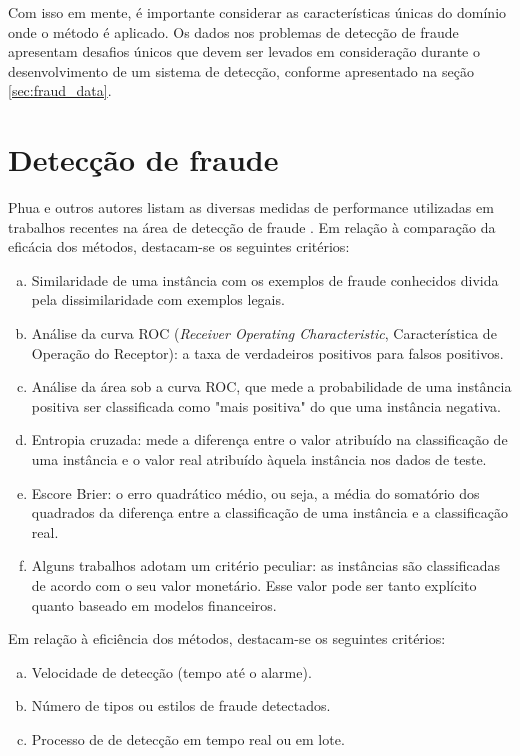 Com isso em mente, é importante considerar as características únicas do domínio onde o método é aplicado. Os dados nos problemas de detecção de fraude apresentam desafios únicos que devem ser levados em consideração durante o desenvolvimento de um sistema de detecção, conforme apresentado na seção \ref{sec:fraud_data}.

\section{Detecção de fraude}
\label{sec:eval_fraud}

Phua e outros autores listam as diversas medidas de performance utilizadas em trabalhos recentes na área de detecção de fraude \cite{Phua2010}. Em relação à comparação da eficácia dos métodos, destacam-se os seguintes critérios:

\begin{enumerate}[a)]
    \item Similaridade de uma instância com os exemplos de fraude conhecidos divida pela dissimilaridade com exemplos legais.
    \item Análise da curva ROC (\emph{Receiver Operating Characteristic}, Característica de Operação do Receptor): a taxa de verdadeiros positivos para falsos positivos.
    \item Análise da área sob a curva ROC, que mede a probabilidade de uma instância positiva ser classificada como "mais positiva" do que uma instância negativa.
    \item Entropia cruzada: mede a diferença entre o valor atribuído na classificação de uma instância e o valor real atribuído àquela instância nos dados de teste.
    \item Escore Brier: o erro quadrático médio, ou seja, a média do somatório dos quadrados da diferença entre a classificação de uma instância e a classificação real.
    \item Alguns trabalhos adotam um critério peculiar: as instâncias são classificadas de acordo com o seu valor monetário. Esse valor pode ser tanto explícito quanto baseado em modelos financeiros.
\end{enumerate}

Em relação à eficiência dos métodos, destacam-se os seguintes critérios:

\begin{enumerate}[a)]
    \item Velocidade de detecção (tempo até o alarme).
    \item Número de tipos ou estilos de fraude detectados.
    \item Processo de de detecção em tempo real ou em lote.
\end{enumerate}

